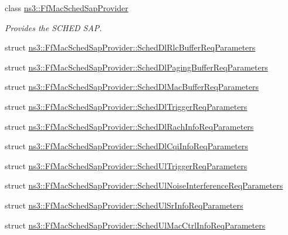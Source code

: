 \begin{DoxyCompactItemize}
\item 
class \hyperlink{classns3_1_1FfMacSchedSapProvider}{ns3\+::\+Ff\+Mac\+Sched\+Sap\+Provider}
\begin{DoxyCompactList}\small\item\em Provides the S\+C\+H\+ED S\+AP. \end{DoxyCompactList}\item 
struct \hyperlink{structns3_1_1FfMacSchedSapProvider_1_1SchedDlRlcBufferReqParameters}{ns3\+::\+Ff\+Mac\+Sched\+Sap\+Provider\+::\+Sched\+Dl\+Rlc\+Buffer\+Req\+Parameters}
\item 
struct \hyperlink{structns3_1_1FfMacSchedSapProvider_1_1SchedDlPagingBufferReqParameters}{ns3\+::\+Ff\+Mac\+Sched\+Sap\+Provider\+::\+Sched\+Dl\+Paging\+Buffer\+Req\+Parameters}
\item 
struct \hyperlink{structns3_1_1FfMacSchedSapProvider_1_1SchedDlMacBufferReqParameters}{ns3\+::\+Ff\+Mac\+Sched\+Sap\+Provider\+::\+Sched\+Dl\+Mac\+Buffer\+Req\+Parameters}
\item 
struct \hyperlink{structns3_1_1FfMacSchedSapProvider_1_1SchedDlTriggerReqParameters}{ns3\+::\+Ff\+Mac\+Sched\+Sap\+Provider\+::\+Sched\+Dl\+Trigger\+Req\+Parameters}
\item 
struct \hyperlink{structns3_1_1FfMacSchedSapProvider_1_1SchedDlRachInfoReqParameters}{ns3\+::\+Ff\+Mac\+Sched\+Sap\+Provider\+::\+Sched\+Dl\+Rach\+Info\+Req\+Parameters}
\item 
struct \hyperlink{structns3_1_1FfMacSchedSapProvider_1_1SchedDlCqiInfoReqParameters}{ns3\+::\+Ff\+Mac\+Sched\+Sap\+Provider\+::\+Sched\+Dl\+Cqi\+Info\+Req\+Parameters}
\item 
struct \hyperlink{structns3_1_1FfMacSchedSapProvider_1_1SchedUlTriggerReqParameters}{ns3\+::\+Ff\+Mac\+Sched\+Sap\+Provider\+::\+Sched\+Ul\+Trigger\+Req\+Parameters}
\item 
struct \hyperlink{structns3_1_1FfMacSchedSapProvider_1_1SchedUlNoiseInterferenceReqParameters}{ns3\+::\+Ff\+Mac\+Sched\+Sap\+Provider\+::\+Sched\+Ul\+Noise\+Interference\+Req\+Parameters}
\item 
struct \hyperlink{structns3_1_1FfMacSchedSapProvider_1_1SchedUlSrInfoReqParameters}{ns3\+::\+Ff\+Mac\+Sched\+Sap\+Provider\+::\+Sched\+Ul\+Sr\+Info\+Req\+Parameters}
\item 
struct \hyperlink{structns3_1_1FfMacSchedSapProvider_1_1SchedUlMacCtrlInfoReqParameters}{ns3\+::\+Ff\+Mac\+Sched\+Sap\+Provider\+::\+Sched\+Ul\+Mac\+Ctrl\+Info\+Req\+Parameters}

\end{DoxyCompactItemize}
